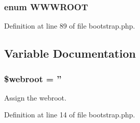 \subsubsection{\setlength{\rightskip}{0pt plus 5cm}enum {\bf WWWROOT}}\label{bootstrap_8php_16ccc7c3a9575ef91fa9bc487d5d7cfa}




Definition at line 89 of file bootstrap.php.

\subsection{Variable Documentation}
\subsubsection{\setlength{\rightskip}{0pt plus 5cm}\$webroot = ''}\label{bootstrap_8php_1ab2a5e3b20ad4ecc7979ef5c9a860e3}


Assign the webroot. 

Definition at line 14 of file bootstrap.php.
